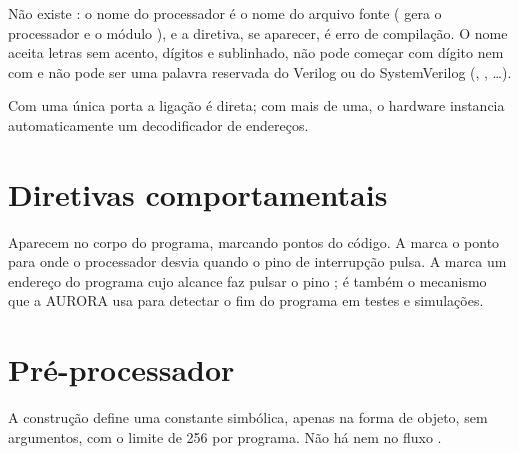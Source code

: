 Não existe : o nome do processador é o nome do arquivo fonte ( gera o processador e o módulo ), e a diretiva, se aparecer, é erro de compilação. O nome aceita letras sem acento, dígitos e sublinhado, não pode começar com dígito nem com \code{\_\_} e não pode ser uma palavra reservada do Verilog ou do SystemVerilog (, , \ldots).

Com uma única porta a ligação é direta; com mais de uma, o hardware instancia automaticamente um decodificador de endereços.

\section{Diretivas comportamentais}

Aparecem no corpo do programa, marcando pontos do código. A  marca o ponto para onde o processador desvia quando o pino de interrupção pulsa. A  marca um endereço do programa cujo alcance faz pulsar o pino ; é também o mecanismo que a AURORA usa para detectar o fim do programa em testes e simulações.

\section{Pré-processador}

A construção  define uma constante simbólica, apenas na forma de objeto, sem argumentos, com o limite de 256 por programa. Não há  nem  no fluxo \cmm{}.
